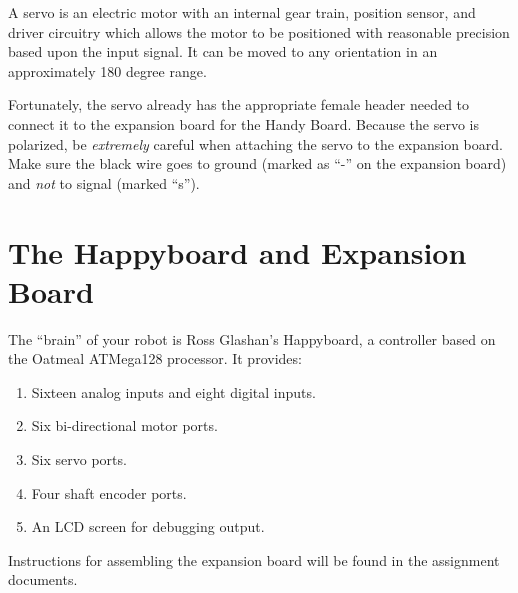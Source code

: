 A servo is an electric motor with an internal gear train, position
sensor, and driver circuitry which allows the motor to be positioned
with reasonable precision based upon the input signal. It can be moved
to any orientation in an approximately 180 degree range.

Fortunately, the servo already has the appropriate female header needed to connect it to the expansion board for the Handy Board. Because the servo is polarized, be {\it extremely} careful when attaching the servo to the expansion board. Make sure the black wire goes to ground (marked as ``-'' on the expansion board) and {\it not} to signal (marked ``s'').


\section{The Happyboard and Expansion Board}

The ``brain'' of your robot is Ross Glashan's Happyboard, a controller
based on the Oatmeal ATMega128 processor.  It provides:

\begin{enumerate}
\item Sixteen analog inputs and eight digital inputs.
\item Six bi-directional motor ports.
\item Six servo ports.
\item Four shaft encoder ports.
\item An LCD screen for debugging output.
\end{enumerate}

Instructions for assembling the expansion board will be found in the assignment
documents.
